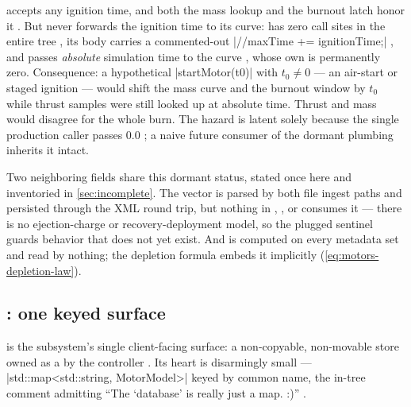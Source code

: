 \begin{hardfail}
 accepts any ignition time, and both the mass lookup and the
burnout latch honor it  . But
 never forwards the ignition time to its curve:
 has zero call sites in the entire tree
, its body carries a commented-out
\cppinline|//maxTime += ignitionTime;| , and
 passes \emph{absolute} simulation time to the curve
, whose own  is permanently zero.
Consequence: a hypothetical \cppinline|startMotor(t0)| with $t_0 \neq 0$ --- an air-start
or staged ignition --- would shift the mass curve and the burnout window by $t_0$ while
thrust samples were still looked up at absolute time. Thrust and mass would disagree for
the whole burn. The hazard is latent solely because the single production caller passes
$0.0$ ; a naive future consumer of the dormant plumbing
inherits it intact. \fail
\end{hardfail}

Two neighboring fields share this dormant status, stated once here and inventoried in
\cref{sec:incomplete}. The  vector is parsed by both file ingest paths and
persisted through the XML round trip, but nothing in , , or
 consumes it --- there is no ejection-charge or recovery-deployment model, so
the plugged sentinel   guards behavior that does
not yet exist. And  is computed on every metadata set
 and read by nothing; the depletion formula embeds it
implicitly (\cref{eq:motors-depletion-law}).

\subsection{: one keyed surface}\label{sec:motors-database}

  is the subsystem's
single client-facing surface: a non-copyable, non-movable
 store owned as a  by the
 controller . Its heart is disarmingly small ---
\cppinline|std::map<std::string, MotorModel>| keyed by common name, the in-tree comment
admitting ``The `database' is really just a map. :)''
.

